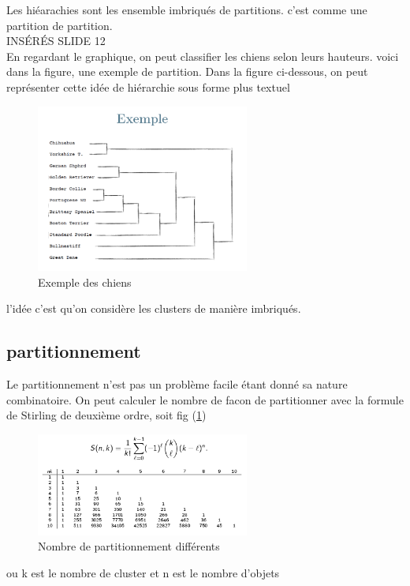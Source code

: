 \documentclass[oneside]{book}
\begin{document}
Les hiéarachies sont les ensemble imbriqués de partitions. c'est comme une partition de partition.\\

INSÉRÉS SLIDE 12\\

En regardant le graphique, on peut classifier les chiens selon leurs hauteurs. voici dans la figure, une exemple de partition. Dans la figure ci-dessous, on peut représenter cette idée de hiérarchie sous forme plus textuel\\

\begin{figure}[!ht]
\centering
\includegraphics[width = 7cm]{classification_exemple.png}
\caption{Exemple des chiens}
\end{figure}

l'idée c'est qu'on considère les clusters de manière imbriqués.\\

\subsection{partitionnement}
Le partitionnement n'est pas un problème facile étant donné sa nature combinatoire. On peut calculer le nombre de facon de partitionner avec la formule de Stirling de deuxième ordre, soit fig (\ref{fig:stirling})\\

\begin{figure}[!ht]
\centering
\includegraphics[width = 7cm]{Stirling.png}
\caption{Nombre de partitionnement différents}
\label{fig:stirling}
\end{figure}
ou k est le nombre de cluster et n est le nombre d'objets
\end{document}
